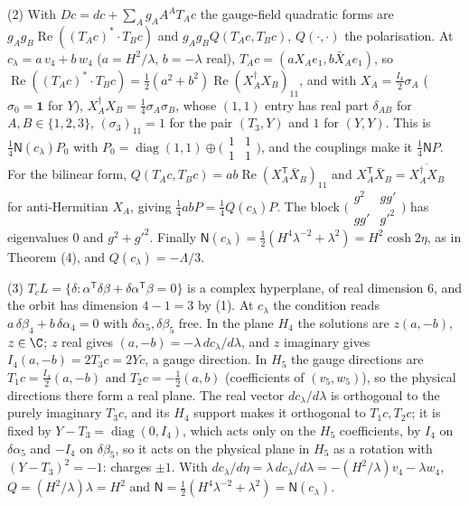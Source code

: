 (2) With $Dc = dc + \sum_{A}g_{A}A^{A}T_{A}c$ the gauge-field quadratic forms are $g_{A}g_{B}\operatorname{Re}((T_{A}c)^{*}\cdot T_{B}c)$ and $g_{A}g_{B}Q(T_{A}c, T_{B}c)$, $Q(\cdot,\cdot)$ the polarisation. At $c_{\lambda} = a\,v_{4} + b\,w_{4}$ ($a = H^{2}/\lambda$, $b = -\lambda$ real), $T_{A}c = (aX_{A}e_{1}, b\bar{X}_{A}e_{1})$, so $\operatorname{Re}((T_{A}c)^{*}\cdot T_{B}c) = \tfrac12(a^{2} + b^{2})\operatorname{Re}(X_{A}^{\dagger}X_{B})_{11}$, and with $X_{A} = \tfrac{I_{4}}{2}\sigma_{A}$ ($\sigma_{0} = \mathbf{1}$ for $Y$), $X_{A}^{\dagger}X_{B} = \tfrac14\sigma_{A}\sigma_{B}$, whose $(1,1)$ entry has real part $\delta_{AB}$ for $A, B \in \{1,2,3\}$, $(\sigma_{3})_{11} = 1$ for the pair $(T_{3}, Y)$ and $1$ for $(Y, Y)$. This is $\tfrac14 \mathsf{N}(c_{\lambda})P_{0}$ with $P_{0} = \operatorname{diag}(1,1) \oplus \bigl(\begin{smallmatrix}1&1\\1&1\end{smallmatrix}\bigr)$, and the couplings make it $\tfrac14 \mathsf{N} P$. For the bilinear form, $Q(T_{A}c, T_{B}c) = ab\operatorname{Re}(X_{A}^{\mathsf T}\bar{X}_{B})_{11}$ and $X_{A}^{\mathsf T}\bar{X}_{B} = \overline{X_{A}^{\dagger}X_{B}}$ for anti-Hermitian $X_{A}$, giving $\tfrac14 ab P = \tfrac14 Q(c_{\lambda})P$. The block $\bigl(\begin{smallmatrix} g^{2} & gg' \\ gg' & g'^{2}\end{smallmatrix}\bigr)$ has eigenvalues $0$ and $g^{2} + g'^{2}$. Finally $\mathsf{N}(c_{\lambda}) = \tfrac12(H^{4}\lambda^{-2} + \lambda^{2}) = H^{2}\cosh 2\eta$, as in Theorem (4), and $Q(c_{\lambda}) = -\Lambda/3$.

(3) $T_{c}L = \{\delta : \alpha^{\mathsf T}\delta\beta + \delta\alpha^{\mathsf T}\beta = 0\}$ is a complex hyperplane, of real dimension $6$, and the orbit has dimension $4 - 1 = 3$ by (1). At $c_{\lambda}$ the condition reads $a\,\delta\beta_{4} + b\,\delta\alpha_{4} = 0$ with $\delta\alpha_{5}, \delta\beta_{5}$ free. In the plane $H_{4}$ the solutions are $z(a, -b)$, $z \in \C$; $z$ real gives $(a, -b) = -\lambda\,dc_{\lambda}/d\lambda$, and $z$ imaginary gives $I_{4}(a, -b) = 2T_{3}c = 2Yc$, a gauge direction. In $H_{5}$ the gauge directions are $T_{1}c = \tfrac{I_{4}}{2}(a, -b)$ and $T_{2}c = -\tfrac12(a, b)$ (coefficients of $(v_{5}, w_{5})$), so the physical directions there form a real plane. The real vector $dc_{\lambda}/d\lambda$ is orthogonal to the purely imaginary $T_{3}c$, and its $H_{4}$ support makes it orthogonal to $T_{1}c, T_{2}c$; it is fixed by $Y - T_{3} = \operatorname{diag}(0, I_{4})$, which acts only on the $H_{5}$ coefficients, by $I_{4}$ on $\delta\alpha_{5}$ and $-I_{4}$ on $\delta\beta_{5}$, so it acts on the physical plane in $H_{5}$ as a rotation with $(Y - T_{3})^{2} = -1$: charges $\pm1$. With $dc_{\lambda}/d\eta = \lambda\,dc_{\lambda}/d\lambda = -(H^{2}/\lambda)v_{4} - \lambda w_{4}$, $Q = (H^{2}/\lambda)\lambda = H^{2}$ and $\mathsf{N} = \tfrac12(H^{4}\lambda^{-2} + \lambda^{2}) = \mathsf{N}(c_{\lambda})$.

